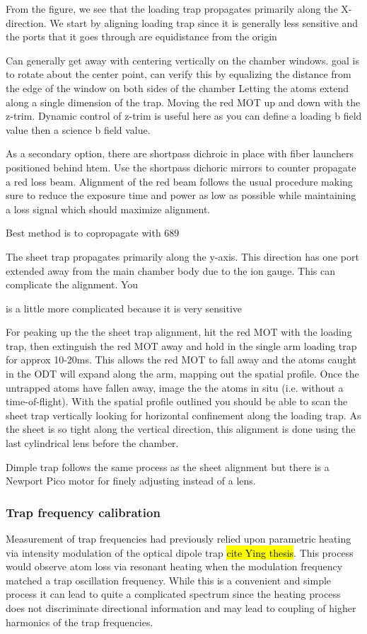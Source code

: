 From the figure, we see that the loading trap propagates primarily along the X-direction. 
We start by aligning loading trap since it is generally less sensitive and the ports that it goes through are equidistance from the origin

Can generally get away with centering vertically on the chamber windows. 
goal is to rotate about the center point, can verify this by equalizing the distance from the edge of the window on both sides of the chamber
Letting the atoms extend along a single dimension of the trap. 
Moving the red MOT up and down with the z-trim. Dynamic control of z-trim is useful here as you can define a loading b field value then a science b field value.

As a secondary option, there are shortpass dichroic in place with fiber launchers positioned behind htem.
Use the shortpass dichoric mirrors to counter propagate a red loss beam. Alignment of the red beam follows the usual procedure making sure to reduce the exposure time and power as low as possible while maintaining a loss signal which should maximize alignment.



Best method is to copropagate with 689

The sheet trap propagates primarily along the y-axis. This direction has one port extended away from the main chamber body due to the ion gauge. This can complicate the alignment. You

is a little more complicated because it is very sensitive

For peaking up the the sheet trap alignment, hit the red MOT with the loading trap, then extinguish the red MOT away and hold in the single arm loading trap for approx 10-20ms. 
This allows the red MOT to fall away and the atoms caught in the ODT will expand along the arm, mapping out the spatial profile.
Once the untrapped atoms have fallen away, image the the atoms in situ (i.e. without a time-of-flight). 
With the spatial profile outlined you should be able to scan the sheet trap vertically looking for horizontal confinement along the loading trap. As the sheet is so tight along the vertical direction, this alignment is done using the last cylindrical lens before the chamber. 

Dimple trap follows the same process as the sheet alignment but there is a Newport Pico motor for finely adjusting instead of a lens.


\subsubsection{Trap frequency calibration} \label{sssec:1064_trap_freq}
Measurement of trap frequencies had previously relied upon parametric heating via intensity modulation of the optical dipole trap \hl{cite Ying thesis}. 
This process would observe atom loss via resonant heating when the modulation frequency matched a trap oscillation frequency. 
While this is a convenient and simple process it can lead to quite a complicated spectrum since the heating process does not discriminate directional information and may lead to coupling of higher harmonics of the trap frequencies. 

